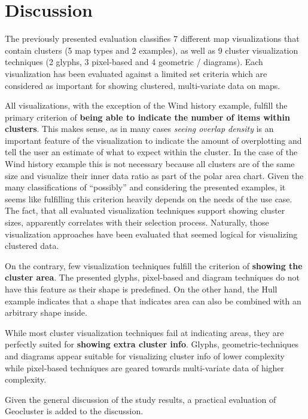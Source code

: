 

\chapter{Discussion}
\label{chapter:discussion}

The previously presented evaluation classifies 7 different map visualizations that contain clusters (5 map types and 2 examples), as well as 9 cluster visualization techniques (2 glyphs, 3 pixel-based and 4 geometric / diagrams). Each visualization has been evaluated against a limited set criteria which are considered as important for showing clustered, multi-variate data on maps.

All visualizations, with the exception of the Wind history example, fulfill the primary criterion of \textbf{being able to indicate the number of items within clusters}. This makes sense, as in many cases \textit{seeing overlap density} is an important feature of the visualization to indicate the amount of overplotting and tell the user an estimate of what to expect within the cluster. In the case of the Wind history example this is not necessary because all clusters are of the same size and visualize their inner data ratio as part of the polar area chart. Given the many classifications of ``possibly'' and considering the presented examples, it seems like fulfilling this criterion heavily depends on the needs of the use case. The fact, that all evaluated visualization techniques support showing cluster sizes, apparently correlates with their selection process. Naturally, those visualization approaches have been evaluated that seemed logical for visualizing clustered data. 

On the contrary, few visualization techniques fulfill the criterion of \textbf{showing the cluster area}. The presented glyphs, pixel-based and diagram techniques do not have this feature as their shape is predefined. On the other hand, the Hull example indicates that a shape that indicates area can also be combined with an arbitrary shape inside.

While most cluster visualization techniques fail at indicating areas, they are perfectly suited for \textbf{showing extra cluster info}. Glyphs, geometric-techniques and diagrams appear suitable for visualizing cluster info of lower complexity while pixel-based techniques are geared towards multi-variate data of higher complexity.


Given the general discussion of the study results, a practical evaluation of Geocluster is added to the discussion.

